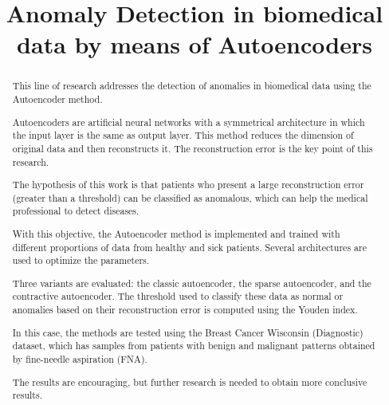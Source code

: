 \documentclass{llncs}
\begin{document}
%
\title{Anomaly Detection in biomedical data by means of Autoencoders}

%
\maketitle              %
%
\begin{abstract}
This line of research addresses the detection of anomalies in biomedical data using the Autoencoder method.

Autoencoders are artificial neural networks with a symmetrical architecture in which the input layer is the same as output layer. 
This method reduces the dimension of original data and then reconstructs it. The reconstruction error is the key point of this research.

The hypothesis of this work is that patients who present a large reconstruction error (greater than a threshold) can be classified as anomalous, which can help the medical professional to detect diseases.

With this objective, the Autoencoder method is implemented
and trained with different proportions of data from healthy and sick patients. Several architectures are used to optimize the parameters.

Three variants are evaluated: the classic autoencoder, the sparse autoencoder, and the contractive autoencoder.
The threshold used to classify these data as normal or anomalies based on their reconstruction error is computed using the Youden index.

In this case, the methods are tested using the
Breast Cancer Wisconsin (Diagnostic) dataset, which has samples from patients with benign and malignant patterns obtained by fine-needle aspiration (FNA).

The results are encouraging, but further research is needed to obtain more conclusive results.

\end{abstract}
\end{document}
